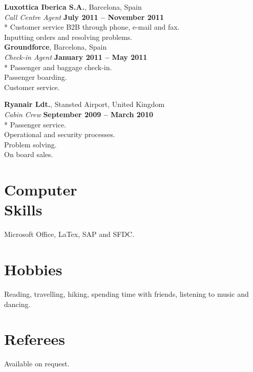 \documentclass[margin,line]{resume}
\begin{document}
\begin{resume}
    \textbf{Luxottica Iberica S.A.}, Barcelona, Spain \vspace{2mm}\\\vspace{1mm}%
    \textsl{Call Centre Agent} \hfill \textbf{July 2011 -- November 2011}\\*
    Customer service B2B through phone, e-mail and fax. \vspace{1mm}\\%
    Inputting orders and resolving problems. \vspace{1mm}\\%

    \textbf{Groundforce}, Barcelona, Spain \vspace{2mm}\\\vspace{1mm}%
    \textsl{Check-in Agent} \hfill \textbf{January 2011 -- May 2011}\\*
    Passenger and baggage check-in. \vspace{1mm}\\%
    Passenger boarding. \vspace{1mm}\\%
    Customer service. \vspace{1mm}\\%
    \clearpage

    \textbf{Ryanair Ldt.}, Stansted Airport, United Kingdom \vspace{2mm}\\\vspace{1mm}%
    \textsl{Cabin Crew} \hfill \textbf{September 2009 -- March 2010}\\*
    Passenger service. \vspace{1mm}\\%
    Operational and security processes. \vspace{1mm}\\%
    Problem solving. \vspace{1mm}\\%
    On board sales. \vspace{1mm}\\%
    
 
    \section{\mysidestyle Computer \\Skills}
    Microsoft Office, LaTex, SAP and SFDC. 
    
    \section{\mysidestyle Hobbies}
    Reading, travelling, hiking, spending time with friends, listening to music and dancing.

    \section{\mysidestyle Referees} 
    Available on request.
    


\end{resume}
\end{document}
